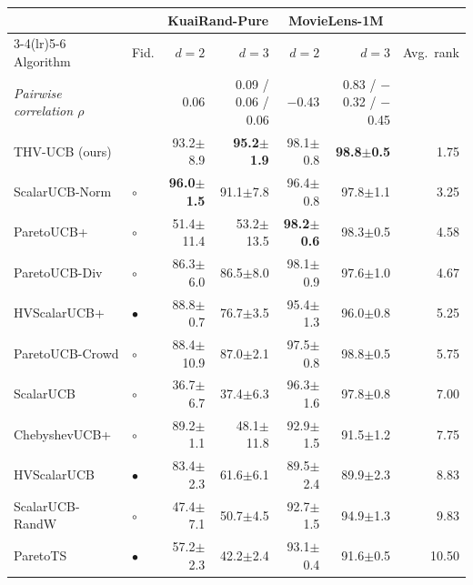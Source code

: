 \begin{tabular}{llrrrrr}
\toprule
 & & \multicolumn{2}{c}{KuaiRand-Pure} & \multicolumn{2}{c}{MovieLens-1M} & \\
\cmidrule(lr){3-4}\cmidrule(lr){5-6}
Algorithm & Fid. & $d=2$ & $d=3$ & $d=2$ & $d=3$ & Avg.\ rank\\
\midrule
\textit{Pairwise correlation $\rho$} & & {\scriptsize 0.06} & {\scriptsize 0.09 / 0.06 / 0.06} & {\scriptsize $-$0.43} & {\scriptsize 0.83 / $-$0.32 / $-$0.45} & \\
\midrule
THV-UCB (ours) &  & 93.2{\scriptsize$\pm$8.9} & \textbf{95.2{\scriptsize$\pm$1.9}} & 98.1{\scriptsize$\pm$0.8} & \textbf{98.8{\scriptsize$\pm$0.5}} & 1.75\\
\midrule
ScalarUCB-Norm & $\circ$ & \textbf{96.0{\scriptsize$\pm$1.5}} & 91.1{\scriptsize$\pm$7.8} & 96.4{\scriptsize$\pm$0.8} & 97.8{\scriptsize$\pm$1.1} & 3.25\\
ParetoUCB+ & $\circ$ & 51.4{\scriptsize$\pm$11.4} & 53.2{\scriptsize$\pm$13.5} & \textbf{98.2{\scriptsize$\pm$0.6}} & 98.3{\scriptsize$\pm$0.5} & 4.58\\
ParetoUCB-Div & $\circ$ & 86.3{\scriptsize$\pm$6.0} & 86.5{\scriptsize$\pm$8.0} & 98.1{\scriptsize$\pm$0.9} & 97.6{\scriptsize$\pm$1.0} & 4.67\\
HVScalarUCB+ & $\bullet$ & 88.8{\scriptsize$\pm$0.7} & 76.7{\scriptsize$\pm$3.5} & 95.4{\scriptsize$\pm$1.3} & 96.0{\scriptsize$\pm$0.8} & 5.25\\
ParetoUCB-Crowd & $\circ$ & 88.4{\scriptsize$\pm$10.9} & 87.0{\scriptsize$\pm$2.1} & 97.5{\scriptsize$\pm$0.8} & 98.8{\scriptsize$\pm$0.5} & 5.75\\
ScalarUCB & $\circ$ & 36.7{\scriptsize$\pm$6.7} & 37.4{\scriptsize$\pm$6.3} & 96.3{\scriptsize$\pm$1.6} & 97.8{\scriptsize$\pm$0.8} & 7.00\\
ChebyshevUCB+ & $\circ$ & 89.2{\scriptsize$\pm$1.1} & 48.1{\scriptsize$\pm$11.8} & 92.9{\scriptsize$\pm$1.5} & 91.5{\scriptsize$\pm$1.2} & 7.75\\
HVScalarUCB & $\bullet$ & 83.4{\scriptsize$\pm$2.3} & 61.6{\scriptsize$\pm$6.1} & 89.5{\scriptsize$\pm$2.4} & 89.9{\scriptsize$\pm$2.3} & 8.83\\
ScalarUCB-RandW & $\circ$ & 47.4{\scriptsize$\pm$7.1} & 50.7{\scriptsize$\pm$4.5} & 92.7{\scriptsize$\pm$1.5} & 94.9{\scriptsize$\pm$1.3} & 9.83\\
ParetoTS & $\bullet$ & 57.2{\scriptsize$\pm$2.3} & 42.2{\scriptsize$\pm$2.4} & 93.1{\scriptsize$\pm$0.4} & 91.6{\scriptsize$\pm$0.5} & 10.50\\

\end{tabular}
